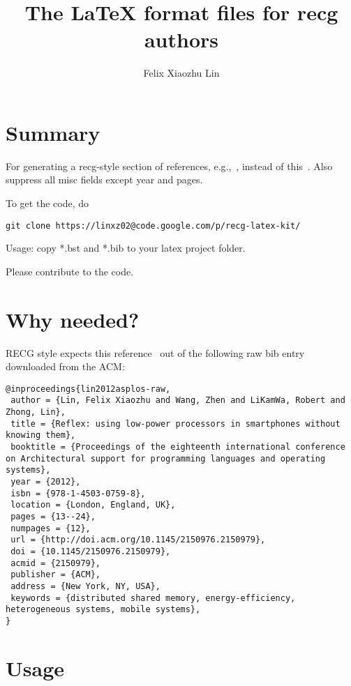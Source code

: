 \documentclass[letterpaper,11pt]{article}
\title{The \LaTeX{} format files for recg authors}
\author{Felix Xiaozhu Lin}
\begin{document}
\maketitle

\section{Summary}

For generating a recg-style section of references, e.g.,~\cite{lin2012asplos}, instead of this~\cite{lin2012asplos-raw}.
Also suppress all misc fields except year and pages.

To get the code, do
\begin{lstlisting}
git clone https://linxz02@code.google.com/p/recg-latex-kit/
\end{lstlisting}

Usage: copy *.bst and *.bib to your latex project folder.

Please contribute to the code.

\section{Why needed?}
RECG style expects this reference~\cite{lin2012asplos} out of the following raw bib entry downloaded from the ACM:

\begin{lstlisting}
@inproceedings{lin2012asplos-raw,
 author = {Lin, Felix Xiaozhu and Wang, Zhen and LiKamWa, Robert and Zhong, Lin},
 title = {Reflex: using low-power processors in smartphones without knowing them},
 booktitle = {Proceedings of the eighteenth international conference on Architectural support for programming languages and operating systems},
 year = {2012},
 isbn = {978-1-4503-0759-8},
 location = {London, England, UK},
 pages = {13--24},
 numpages = {12},
 url = {http://doi.acm.org/10.1145/2150976.2150979},
 doi = {10.1145/2150976.2150979},
 acmid = {2150979},
 publisher = {ACM},
 address = {New York, NY, USA},
 keywords = {distributed shared memory, energy-efficiency, heterogeneous systems, mobile systems},
} 
\end{lstlisting}

\section{Usage}
\end{document}
